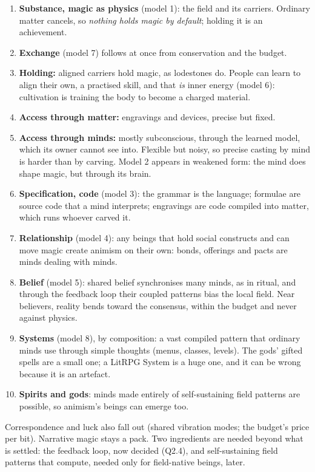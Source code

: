 \documentclass[11pt,a4paper]{article}
\begin{document}
\begin{enumerate}
  \item \textbf{Substance, magic as physics} (model 1): the field and its carriers. Ordinary matter cancels, so \emph{nothing holds magic by default}; holding it is an achievement.
  \item \textbf{Exchange} (model 7) follows at once from conservation and the budget.
  \item \textbf{Holding:} aligned carriers hold magic, as lodestones do. People can learn to align their own, a practised skill, and that \emph{is} inner energy (model 6): cultivation is training the body to become a charged material.
  \item \textbf{Access through matter:} engravings and devices, precise but fixed.
  \item \textbf{Access through minds:} mostly subconscious, through the learned model, which its owner cannot see into. Flexible but noisy, so precise casting by mind is harder than by carving. Model 2 appears in weakened form: the mind does shape magic, but through its brain.
  \item \textbf{Specification, code} (model 3): the grammar is the language; formulae are source code that a mind interprets; engravings are code compiled into matter, which runs whoever carved it.
  \item \textbf{Relationship} (model 4): any beings that hold social constructs and can move magic create animism on their own: bonds, offerings and pacts are minds dealing with minds.
  \item \textbf{Belief} (model 5): shared belief synchronises many minds, as in ritual, and through the feedback loop their coupled patterns bias the local field. Near believers, reality bends toward the consensus, within the budget and never against physics.
  \item \textbf{Systems} (model 8), by composition: a vast compiled pattern that ordinary minds use through simple thoughts (menus, classes, levels). The gods' gifted spells are a small one; a LitRPG System is a huge one, and it can be wrong because it is an artefact.
  \item \textbf{Spirits and gods}: minds made entirely of self-sustaining field patterns are possible, so animism's beings can emerge too.
\end{enumerate}
Correspondence and luck also fall out (shared vibration modes; the budget's price per bit). Narrative magic stays a pack. Two ingredients are needed beyond what is settled: the feedback loop, now decided (Q2.4), and self-sustaining field patterns that compute, needed only for field-native beings, later.
\end{document}
